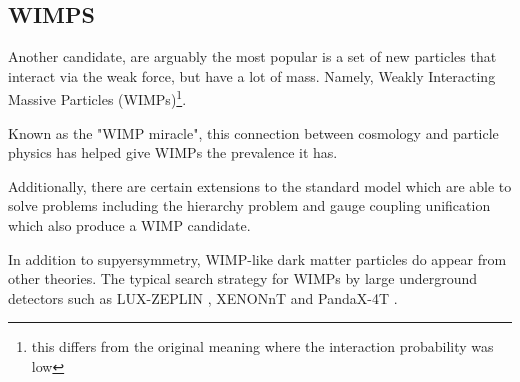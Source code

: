 \subsection{WIMPS}
\label{sec:wimp_as_a_candidate}
\par
Another candidate, are arguably the most popular is a set of new particles that interact via the weak force, but have a lot of mass.
Namely, Weakly Interacting Massive Particles (WIMPs)\footnote{this differs from the original meaning where the interaction probability was low}. 



\par
Known as the "WIMP miracle", this connection between cosmology and particle physics has helped give WIMPs the prevalence it has.


\par
Additionally, there are certain extensions to the standard model which are able to solve problems including the hierarchy problem and gauge coupling unification which also produce a WIMP candidate.


\par
In addition to supyersymmetry, WIMP-like dark matter particles do appear from other theories.
The typical search strategy for WIMPs by large underground detectors such as LUX-ZEPLIN \cite{LZ_TechnicalDesignReview_ref}, XENONnT \cite{xenonnt_projected_sensitivty_ref} and PandaX-4T \cite{pandax_4t_ref}.